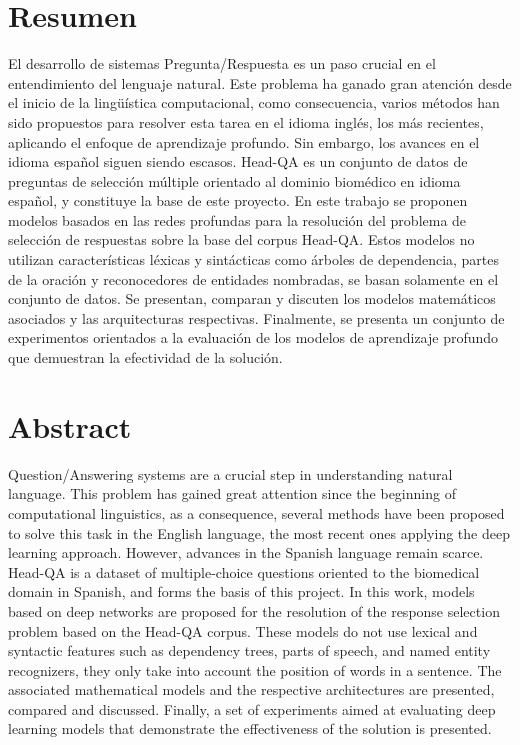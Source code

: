 \chapter*{Resumen}\label{chapter:resumen}

El desarrollo de sistemas Pregunta/Respuesta es un paso crucial en el entendimiento del lenguaje natural. Este problema ha ganado gran atención desde el inicio de la lingüística computacional, como consecuencia, varios métodos han sido propuestos para resolver esta tarea en el idioma inglés, los más recientes, aplicando el enfoque de aprendizaje profundo. Sin embargo, los avances en el idioma español siguen siendo escasos. Head-QA es un conjunto de datos de preguntas de selección múltiple orientado al dominio biomédico en idioma español, y constituye la base de este proyecto. En este trabajo se proponen modelos basados en las redes profundas para la resolución del problema de selección de respuestas sobre la base del corpus Head-QA. Estos modelos no utilizan características léxicas y sintácticas como árboles de dependencia, partes de la oración y reconocedores de entidades nombradas, se basan solamente en el conjunto de datos. Se presentan, comparan y discuten los modelos matemáticos asociados y las arquitecturas respectivas. Finalmente, se presenta un conjunto de experimentos orientados a la evaluación de los modelos de aprendizaje profundo que demuestran la efectividad de la solución.

\newpage
\chapter*{Abstract}\label{chapter:abstract}

Question/Answering systems are a crucial step in understanding natural language. This problem has gained great attention since the beginning of computational linguistics, as a consequence, several methods have been proposed to solve this task in the English language, the most recent ones applying the deep learning approach. However, advances in the Spanish language remain scarce. Head-QA is a dataset of multiple-choice questions oriented to the biomedical domain in Spanish, and forms the basis of this project. In this work, models based on deep networks are proposed for the resolution of the response selection problem based on the Head-QA corpus. These models do not use lexical and syntactic features such as dependency trees, parts of speech, and named entity recognizers, they only take into account the position of words in a sentence. The associated mathematical models and the respective architectures are presented, compared and discussed. Finally, a set of experiments aimed at evaluating deep learning models that demonstrate the effectiveness of the solution is presented.